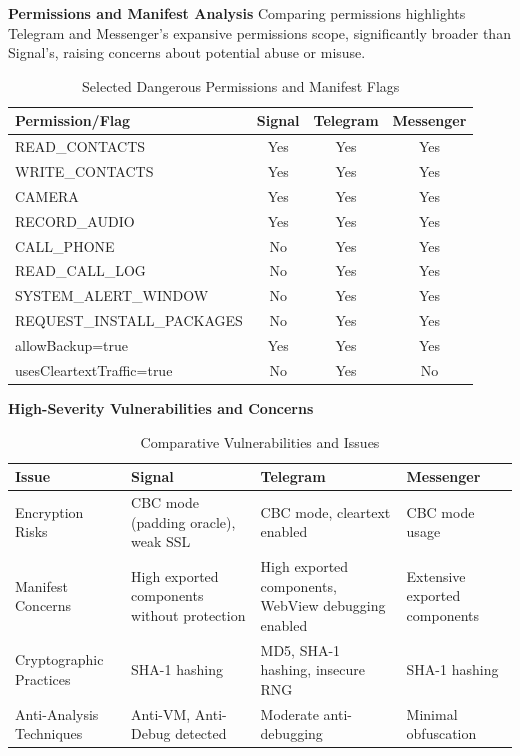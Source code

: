 \documentclass[a4paper,12pt]{report}
\begin{document}
\textbf{Permissions and Manifest Analysis}
Comparing permissions highlights Telegram and Messenger's expansive permissions scope, significantly broader than Signal's, raising concerns about potential abuse or misuse.

\begin{table}[H]
\centering
\begin{tabular}{|l|c|c|c|}
\hline
\textbf{Permission/Flag} & \textbf{Signal} & \textbf{Telegram} & \textbf{Messenger} \\
\hline
READ\_CONTACTS & Yes & Yes & Yes \\
WRITE\_CONTACTS & Yes & Yes & Yes \\
CAMERA & Yes & Yes & Yes \\
RECORD\_AUDIO & Yes & Yes & Yes \\
CALL\_PHONE & No & Yes & Yes \\
READ\_CALL\_LOG & No & Yes & Yes \\
SYSTEM\_ALERT\_WINDOW & No & Yes & Yes \\
REQUEST\_INSTALL\_PACKAGES & No & Yes & Yes \\
allowBackup=true & Yes & Yes & Yes \\
usesCleartextTraffic=true & No & Yes & No \\
\hline
\end{tabular}
\caption{Selected Dangerous Permissions and Manifest Flags}
\label{tab:permissions}
\end{table}

\textbf{High-Severity Vulnerabilities and Concerns}

\begin{table}[H]
\centering
\begin{tabular}{|p{3cm}|p{3.5cm}|p{3.5cm}|p{3.5cm}|}
\hline
\textbf{Issue} & \textbf{Signal} & \textbf{Telegram} & \textbf{Messenger} \\
\hline
Encryption Risks & CBC mode (padding oracle), weak SSL & CBC mode, cleartext enabled & CBC mode usage \\
Manifest Concerns & High exported components without protection & High exported components, WebView debugging enabled & Extensive exported components \\
Cryptographic Practices & SHA-1 hashing & MD5, SHA-1 hashing, insecure RNG & SHA-1 hashing \\
Anti-Analysis Techniques & Anti-VM, Anti-Debug detected & Moderate anti-debugging & Minimal obfuscation \\
\hline
\end{tabular}
\caption{Comparative Vulnerabilities and Issues}
\label{tab:vulnerabilities}
\end{table}
\end{document}
